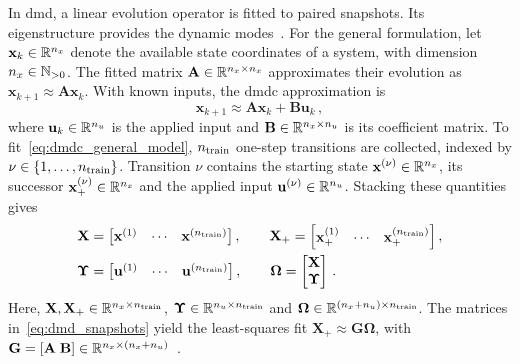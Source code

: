 In \ac{dmd}, a linear evolution operator is fitted to paired snapshots.
Its eigenstructure provides the dynamic modes~\cite{Proctor2016}.
For the general formulation, let $\mathbf{x}_k\in\mathbb{R}^{n_{x}}$ denote the available state coordinates of a system, with dimension $n_{x}\in\mathbb{N}_{>0}$.
The fitted matrix $\mathbf{A}\in\mathbb{R}^{n_{x}\times n_{x}}$ approximates their evolution as $\mathbf{x}_{k+1}\approx\mathbf{A}\mathbf{x}_k$.
With known inputs, the \ac{dmdc} approximation is~\cite{Proctor2016}
\begin{equation}
    \mathbf{x}_{k+1}\approx\mathbf{A}\mathbf{x}_k+\mathbf{B}\mathbf{u}_k\,,
    \label{eq:dmdc_general_model}
\end{equation}
where $\mathbf{u}_k\in\mathbb{R}^{n_{u}}$ is the applied input and $\mathbf{B}\in\mathbb{R}^{n_{x}\times n_{u}}$ is its coefficient matrix.
To fit~\eqref{eq:dmdc_general_model}, $n_{\mathrm{train}}{}$ one-step transitions are collected, indexed by $\nu\in\{1,\ldots,n_{\mathrm{train}}{}\}$.
Transition $\nu$ contains the starting state $\mathbf{x}^{(\nu)}\in\mathbb{R}^{n_{x}}$, its successor $\mathbf{x}_+^{(\nu)}\in\mathbb{R}^{n_{x}}$ and the applied input $\mathbf{u}^{(\nu)}\in\mathbb{R}^{n_{u}}$.
Stacking these quantities gives
\begin{equation}
    \begin{aligned}
    \mathbf{X}&=\begin{bmatrix}\mathbf{x}^{(1)}&\cdots&\mathbf{x}^{(n_{\mathrm{train}}{})}\end{bmatrix},
    \qquad
    \mathbf{X}_+=\begin{bmatrix}\mathbf{x}_+^{(1)}&\cdots&\mathbf{x}_+^{(n_{\mathrm{train}}{})}\end{bmatrix},\\
    \boldsymbol{\Upsilon}&=\begin{bmatrix}\mathbf{u}^{(1)}&\cdots&\mathbf{u}^{(n_{\mathrm{train}}{})}\end{bmatrix},
    \qquad
    \boldsymbol{\Omega}
    =\begin{bmatrix}\mathbf{X}\\\boldsymbol{\Upsilon}\end{bmatrix}\,.
    \end{aligned}
    \label{eq:dmd_snapshots}
\end{equation}
Here, $\mathbf{X},\mathbf{X}_+\in\mathbb{R}^{n_{x}\times n_{\mathrm{train}}{}}$, $\boldsymbol{\Upsilon}\in\mathbb{R}^{n_{u}\times n_{\mathrm{train}}{}}$ and $\boldsymbol{\Omega}\in\mathbb{R}^{(n_{x}+n_{u})\times n_{\mathrm{train}}{}}$.
The matrices in~\eqref{eq:dmd_snapshots} yield the least-squares fit $\mathbf{X}_+\approx\mathbf{G}\boldsymbol{\Omega}$, with $\mathbf{G}=[\mathbf{A}\;\mathbf{B}]\in\mathbb{R}^{n_{x}\times(n_{x}+n_{u})}$~\cite{Proctor2016}.

